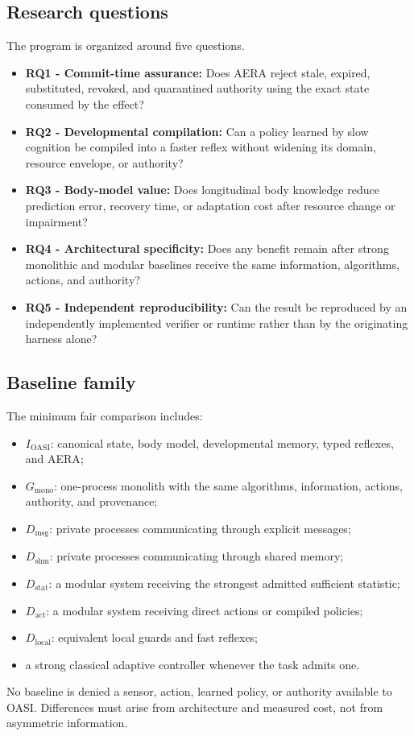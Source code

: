 \documentclass[journal,10pt]{IEEEtran}
\newcommand{\OASI}{\textsc{OASI}}
\newcommand{\AERA}{\textsc{AERA}}
\begin{document}
\subsection{Research questions}
The program is organized around five questions.
\begin{itemize}
  \item \textbf{RQ1 - Commit-time assurance:} Does \AERA{} reject stale, expired, substituted, revoked, and quarantined authority using the exact state consumed by the effect?
  \item \textbf{RQ2 - Developmental compilation:} Can a policy learned by slow cognition be compiled into a faster reflex without widening its domain, resource envelope, or authority?
  \item \textbf{RQ3 - Body-model value:} Does longitudinal body knowledge reduce prediction error, recovery time, or adaptation cost after resource change or impairment?
  \item \textbf{RQ4 - Architectural specificity:} Does any benefit remain after strong monolithic and modular baselines receive the same information, algorithms, actions, and authority?
  \item \textbf{RQ5 - Independent reproducibility:} Can the result be reproduced by an independently implemented verifier or runtime rather than by the originating harness alone?
\end{itemize}

\subsection{Baseline family}
The minimum fair comparison includes:
\begin{itemize}
  \item $I_{\mathrm{OASI}}$: canonical state, body model, developmental memory, typed reflexes, and \AERA;
  \item $G_{\mathrm{mono}}$: one-process monolith with the same algorithms, information, actions, authority, and provenance;
  \item $D_{\mathrm{msg}}$: private processes communicating through explicit messages;
  \item $D_{\mathrm{shm}}$: private processes communicating through shared memory;
  \item $D_{\mathrm{stat}}$: a modular system receiving the strongest admitted sufficient statistic;
  \item $D_{\mathrm{act}}$: a modular system receiving direct actions or compiled policies;
  \item $D_{\mathrm{local}}$: equivalent local guards and fast reflexes;
  \item a strong classical adaptive controller whenever the task admits one.
\end{itemize}
No baseline is denied a sensor, action, learned policy, or authority available to \OASI{}. Differences must arise from architecture and measured cost, not from asymmetric information.
\end{document}
